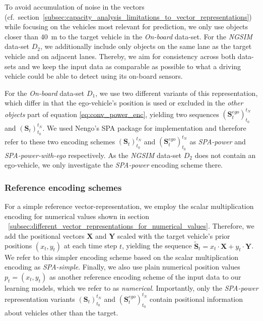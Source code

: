 To avoid accumulation of noise in the vectors (cf.\ section~\ref{subsec:capacity_analysis_limitations_to_vector_representations}) while focusing on the vehicles most relevant for prediction, we only use objects closer than \SI{40}{\meter} to the target vehicle in the \emph{On-board} data-set.
For the \emph{\ac{NGSIM}} data-set $D_2$, we additionally include only objects on the same lane as the target vehicle and on adjacent lanes.
Thereby, we aim for consistency across both data-sets and we keep the input data as comparable as possible to what a driving vehicle could be able to detect using its on-board sensors.

For the \emph{On-board} data-set $D_1$, we use two different variants of this representation, which differ in that the ego-vehicle's position is used or excluded in the \emph{other objects} part of equation \eqref{eq:conv_power_enc}, yielding two sequences $(\mathbf{S}_{t}^{ego})_{t_0}^{t_N}$ and $(\mathbf{S}_{t})_{t_0}^{t_N}$.
We used \acs{Nengo}'s \ac{SPA} package for implementation and therefore refer to these two encoding schemes $(\mathbf{S}_{t})_{t_0}^{t_N}$ and $(\mathbf{S}_{t}^{ego})_{t_0}^{t_N}$ as \emph{\ac{SPA}-power} and \emph{\ac{SPA}-power-with-ego} respectively.
As the \emph{\ac{NGSIM}} data-set $D_2$ does not contain an ego-vehicle, we only investigate the \emph{\ac{SPA}-power} encoding scheme there.

\subsubsection{Reference encoding schemes}%
\label{ssubsec:reference_encoding_schemes}

For a simple reference vector-representation, we employ the scalar multiplication encoding for numerical values shown in section ~\ref{subsec:different_vector_representations_for_numerical_values}.
Therefore, we add the positional vectors $\mathbf{X}$ and $\mathbf{Y}$ scaled with the target vehicle's prior positions $(x_{t}, y_{t})$ at each time step $t$, yielding the sequence $\tilde{\mathbf{S}}_{t} =  x_{t} \cdot \mathbf{X} + y_{t}\cdot \mathbf{Y}$.
We refer to this simpler encoding scheme based on the scalar multiplication encoding as \emph{\ac{SPA}-simple}.
Finally, we also use plain numerical position values $p_t = (x_{t}, y_{t})$ as another reference encoding scheme of the input data to our learning models, which we refer to as \emph{numerical}.
Importantly, only the \emph{\ac{SPA}-power} representation variants $(\mathbf{S}_{t})_{t_0}^{t_N}$ and $(\mathbf{S}_{t}^{ego})_{t_0}^{t_N}$ contain positional information about vehicles other than the target.

